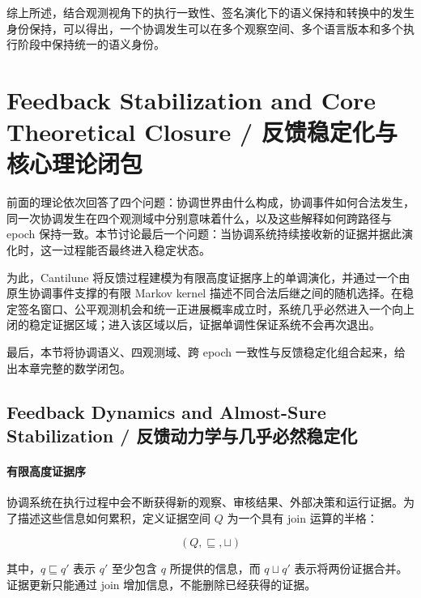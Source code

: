   综上所述，结合观测视角下的执行一致性、签名演化下的语义保持和转换中的发生身份保持，可以得出，一个协调发生可以在多个观察空间、多个语言版本和多个执行阶段中保持统一的语义身份。



  \section{Feedback Stabilization and Core Theoretical Closure /
  反馈稳定化与核心理论闭包}
  \label{sec:feedback-stabilization-and-core-closure}

  前面的理论依次回答了四个问题：协调世界由什么构成，协调事件如何合法发生，同一次协调发生在四个观测域中分别意味着什么，以及这些解释如何跨路径与 epoch 保持一致。本节讨论最后一个问题：当协调系统持续接收新的证据并据此演化时，这一过程能否最终进入稳定状态。

  为此，Cantilune 将反馈过程建模为有限高度证据序上的单调演化，并通过一个由原生协调事件支撑的有限 Markov kernel 描述不同合法后继之间的随机选择。在稳定签名窗口、公平观测机会和统一正进展概率成立时，系统几乎必然进入一个向上闭的稳定证据区域；进入该区域以后，证据单调性保证系统不会再次退出。

  最后，本节将协调语义、四观测域、跨 epoch 一致性与反馈稳定化组合起来，给出本章完整的数学闭包。

  \subsection{Feedback Dynamics and Almost-Sure Stabilization /
  反馈动力学与几乎必然稳定化}
  \label{subsec:feedback-dynamics-and-stabilization}

  \paragraph{有限高度证据序}

  协调系统在执行过程中会不断获得新的观察、审核结果、外部决策和运行证据。为了描述这些信息如何累积，定义证据空间 $Q$ 为一个具有 join 运算的半格：

  \begin{equation}
    \boxed{
      (Q,\sqsubseteq,\sqcup)
    }
    \label{eq:feedback-evidence-order}
  \end{equation}

  其中，$q\sqsubseteq q'$ 表示 $q'$ 至少包含 $q$ 所提供的信息，而 $q\sqcup q'$ 表示将两份证据合并。证据更新只能通过 join 增加信息，不能删除已经获得的证据。

